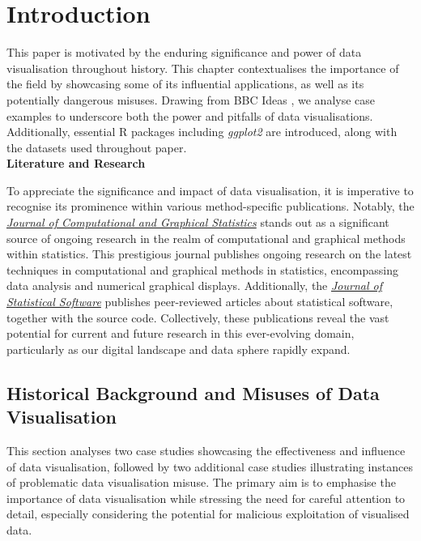 \documentclass{article}\usepackage[]{graphicx}\usepackage[]{xcolor}
\numberwithin{equation}{section}
\begin{document}
\newpage 

\tableofcontents

\newpage

\section{Introduction}

\noindent
This paper is motivated by the enduring significance and power of data visualisation throughout history. This chapter contextualises the importance of the field by showcasing some of its influential applications, as well as its potentially dangerous misuses. Drawing from BBC Ideas \cite{bbcdatavis}, we analyse case examples to underscore both the power and pitfalls of data visualisations. Additionally, essential R packages including \textit{ggplot2} are introduced, along with the datasets used throughout paper.\\

\noindent \textbf{Literature and Research} 

\noindent
To appreciate the significance and impact of data visualisation, it is imperative to recognise its prominence within various method-specific publications. Notably, the \href{https://www.tandfonline.com/journals/ucgs20}{\textit{Journal of Computational and Graphical Statistics}} stands out as a significant source of ongoing research in the realm of computational and graphical methods within statistics. This prestigious journal publishes ongoing research on the latest techniques in computational and graphical methods in statistics, encompassing data analysis and numerical graphical displays. Additionally, the \href{https://www.jstatsoft.org/index}{\textit{Journal of Statistical Software}} publishes peer-reviewed articles about statistical software, together with the source code. Collectively, these publications reveal the vast potential for current and future research in this ever-evolving domain, particularly as our digital landscape and data sphere rapidly expand.

\subsection{Historical Background and Misuses of Data Visualisation}

\noindent This section analyses two case studies showcasing the effectiveness and influence of data visualisation, followed by two additional case studies illustrating instances of problematic data visualisation misuse. The primary aim is to emphasise the importance of data visualisation while stressing the need for careful attention to detail, especially considering the potential for malicious exploitation of visualised data.\\
\end{document}
